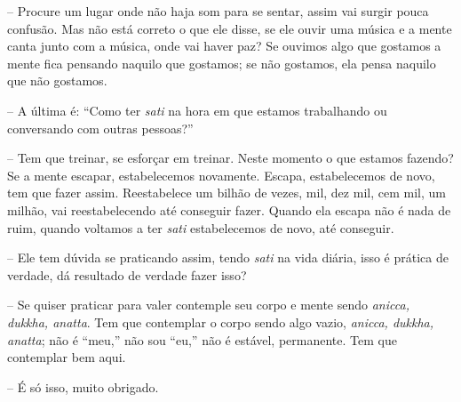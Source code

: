 -- Procure um lugar onde não haja som para se sentar, assim vai
surgir pouca confusão. Mas não está correto o que ele disse, se ele
ouvir uma música e a mente canta junto com a música, onde vai haver
paz? Se ouvimos algo que gostamos a mente fica pensando naquilo que
gostamos; se não gostamos, ela pensa naquilo que não gostamos.

-- A última é: “Como ter \textit{sati} na hora em que estamos
trabalhando ou conversando com outras pessoas?”

-- Tem que treinar, se esforçar em treinar. Neste momento o que
estamos fazendo? Se a mente escapar, estabelecemos novamente. Escapa,
estabelecemos de novo, tem que fazer assim. Reestabelece um bilhão de
vezes, mil, dez mil, cem mil, um milhão, vai reestabelecendo até
conseguir fazer. Quando ela escapa não é nada de ruim, quando voltamos
a ter \textit{sati} estabelecemos de novo, até conseguir.

-- Ele tem dúvida se praticando assim, tendo \textit{sati} na vida
diária, isso é prática de verdade, dá resultado de verdade fazer isso?

-- Se quiser praticar para valer contemple seu corpo e mente sendo
\textit{anicca, dukkha, anatta}. Tem que contemplar o corpo sendo algo
vazio, \textit{anicca, dukkha, anatta}; não é “meu,” não sou “eu,” não
é estável, permanente. Tem que contemplar bem aqui.

-- É só isso, muito obrigado.

